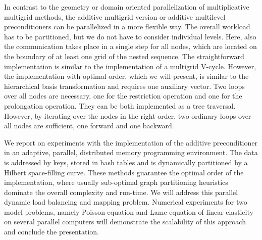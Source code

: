 \documentclass[11pt]{article}
\begin{document}
In contrast to the geometry or domain oriented parallelization of multiplicative
multigrid methods, the additive multigrid version or additive multilevel
preconditioners can be parallelized in a more flexible way. The overall
workload has to be partitioned, but we do not have to consider individual
levels. Here, also the communication takes place in a single step for all
nodes, which are located on the boundary of at least one grid of the nested
sequence. The straightforward implementation is similar to the implementation
of a multigrid V-cycle. However, the implementation with optimal order,
which we will present, is similar to the hierarchical basis transformation
and requires one auxiliary vector. Two loops over all nodes are necessary,
one for the restriction operation and one for the prolongation operation.
They can be both implemented as a tree traversal. However, by iterating
over the nodes in the right order, two ordinary loops over all nodes are
sufficient, one forward and one backward.

We report on experiments with the implementation of the additive preconditioner
in an adaptive, parallel, distributed memory programming environment. The
data is addressed by keys, stored in hash tables and is dynamically partitioned
by a Hilbert space-filling curve. These methods guarantee the optimal order
of the implementation, where usually sub-optimal graph partitioning heuristics
dominate the overall complexity and run-time. We will address this parallel
dynamic load balancing and mapping problem. Numerical experiments for two
model problems, namely Poisson equation and Lame equation of linear elasticity
on several parallel computers will demonstrate the scalability of this
approach and conclude the presentation.
\end{document}
